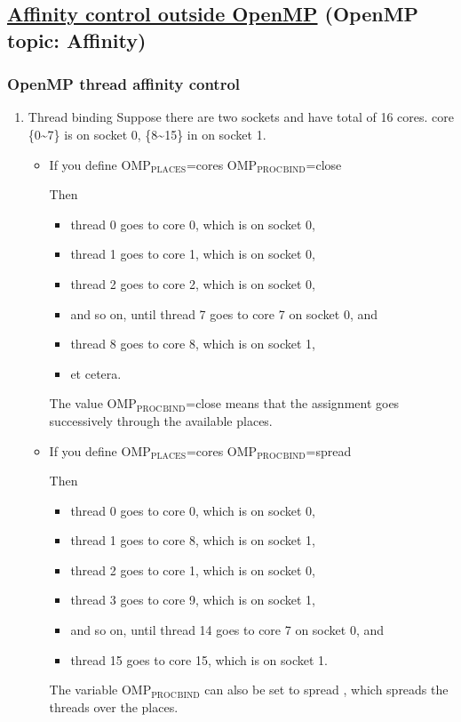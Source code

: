\documentclass[11pt]{article}
\begin{document}
\subsection{\href{http://pages.tacc.utexas.edu/~eijkhout/pcse/html/omp-affinity.html}{Affinity control outside OpenMP} (OpenMP topic: Affinity)}
\label{sec-7-3}
\subsubsection{OpenMP thread affinity control}
\label{sec-7-3-1}
\begin{enumerate}
\item Thread binding
\label{sec-7-3-1-1}
Suppose there are two sockets and have total of 16 cores. core \{0\textasciitilde{}7\} is on socket 0, \{8\textasciitilde{}15\} in on socket 1.
\begin{itemize}
\item If you define
OMP$_{\text{PLACES}}$=cores
OMP$_{\text{PROC}}$$_{\text{BIND}}$=close

Then
\begin{itemize}
\item thread 0 goes to core 0, which is on socket 0,
\item thread 1 goes to core 1, which is on socket 0,
\item thread 2 goes to core 2, which is on socket 0,
\item and so on, until thread 7 goes to core 7 on socket 0, and
\item thread 8 goes to core 8, which is on socket 1,
\item et cetera.
\end{itemize}
The value OMP$_{\text{PROC}}$$_{\text{BIND}}$=close means that the assignment goes successively through the available places.

\item If you define
OMP$_{\text{PLACES}}$=cores
OMP$_{\text{PROC}}$$_{\text{BIND}}$=spread

Then
\begin{itemize}
\item thread 0 goes to core 0, which is on socket 0,
\item thread 1 goes to core 8, which is on socket 1,
\item thread 2 goes to core 1, which is on socket 0,
\item thread 3 goes to core 9, which is on socket 1,
\item and so on, until thread 14 goes to core 7 on socket 0, and
\item thread 15 goes to core 15, which is on socket 1.
\end{itemize}
The variable OMP$_{\text{PROC}}$$_{\text{BIND}}$ can also be set to spread , which spreads the threads over the places.


\end{itemize}
\end{enumerate}
\end{document}
